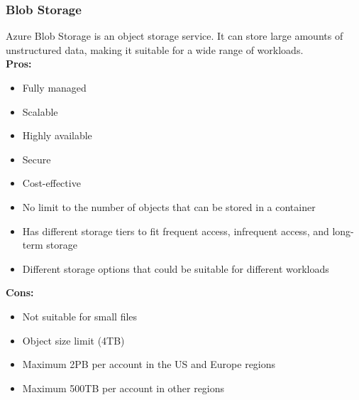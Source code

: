         \subsubsection{Blob Storage}
        \label{azure:blob-storage}
 Azure Blob Storage is an object storage service. It can store large amounts of unstructured data, making it suitable for a wide range of workloads.\\
        \textbf{Pros:}
        \begin{itemize}
            \item Fully managed
            \item Scalable
            \item Highly available
            \item Secure
            \item Cost-effective
            \item No limit to the number of objects that can be stored in a container
            \item Has different storage tiers to fit frequent access, infrequent access, and long-term storage
            \item Different storage options that could be suitable for different workloads
        \end{itemize}
        \textbf{Cons:}
        \begin{itemize}
            \item Not suitable for small files
            \item Object size limit (4TB)
            \item Maximum 2PB per account in the US and Europe regions
            \item Maximum 500TB per account in other regions
        \end{itemize}

